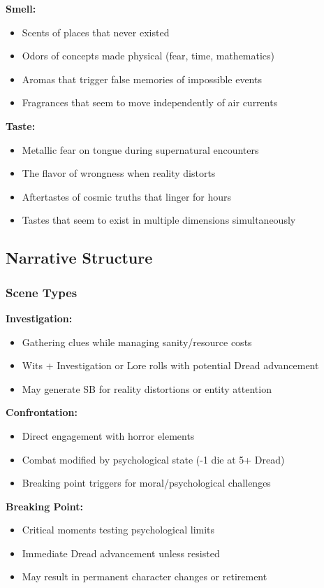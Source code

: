 \documentclass[11pt]{article}
\begin{document}
\textbf{Smell:}
\begin{itemize}
\item Scents of places that never existed
\item Odors of concepts made physical (fear, time, mathematics)
\item Aromas that trigger false memories of impossible events
\item Fragrances that seem to move independently of air currents
\end{itemize}

\textbf{Taste:}
\begin{itemize}
\item Metallic fear on tongue during supernatural encounters
\item The flavor of wrongness when reality distorts
\item Aftertastes of cosmic truths that linger for hours
\item Tastes that seem to exist in multiple dimensions simultaneously
\end{itemize}

\subsection{Narrative Structure}

\subsubsection{Scene Types}

\textbf{Investigation:}
\begin{itemize}
\item Gathering clues while managing sanity/resource costs
\item Wits + Investigation or Lore rolls with potential Dread advancement
\item May generate SB for reality distortions or entity attention
\end{itemize}

\textbf{Confrontation:}
\begin{itemize}
\item Direct engagement with horror elements
\item Combat modified by psychological state (-1 die at 5+ Dread)
\item Breaking point triggers for moral/psychological challenges
\end{itemize}

\textbf{Breaking Point:}
\begin{itemize}
\item Critical moments testing psychological limits
\item Immediate Dread advancement unless resisted
\item May result in permanent character changes or retirement
\end{itemize}
\end{document}
